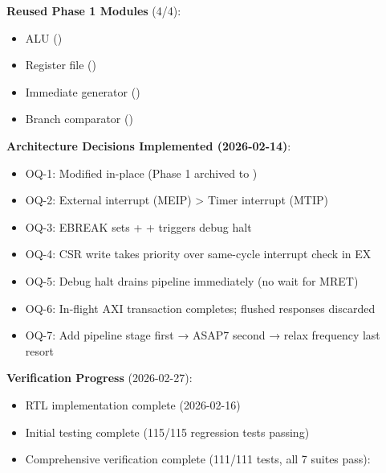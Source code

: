 \begin{record}
\textbf{Reused Phase 1 Modules} (4/4):

\begin{itemize}
\tightlist
\item
  ALU ()
\item
  Register file ()
\item
  Immediate generator ()
\item
  Branch comparator ()
\end{itemize}

\textbf{Architecture Decisions Implemented (2026-02-14)}:

\begin{itemize}
\tightlist
\item
  OQ-1: \ok{} Modified in-place (Phase 1 archived to )
\item
  OQ-2: \ok{} External interrupt (MEIP) \textgreater{} Timer interrupt
  (MTIP)
\item
  OQ-3: \ok{} EBREAK sets  +  + triggers debug
  halt
\item
  OQ-4: \ok{} CSR write takes priority over same-cycle interrupt check
  in EX
\item
  OQ-5: \ok{} Debug halt drains pipeline immediately (no wait for MRET)
\item
  OQ-6: \ok{} In-flight AXI transaction completes; flushed responses
  discarded
\item
  OQ-7: \ok{} Add pipeline stage first → ASAP7 second → relax frequency
  last resort
\end{itemize}

\textbf{Verification Progress} (2026-02-27):

\begin{itemize}
\tightlist
\item
  \ok{} RTL implementation complete (2026-02-16)
\item
  \ok{} Initial testing complete (115/115 regression tests passing)
\item
  \ok{} Comprehensive verification complete (111/111 tests, all 7 suites
  pass):


\end{itemize}
\end{record}
